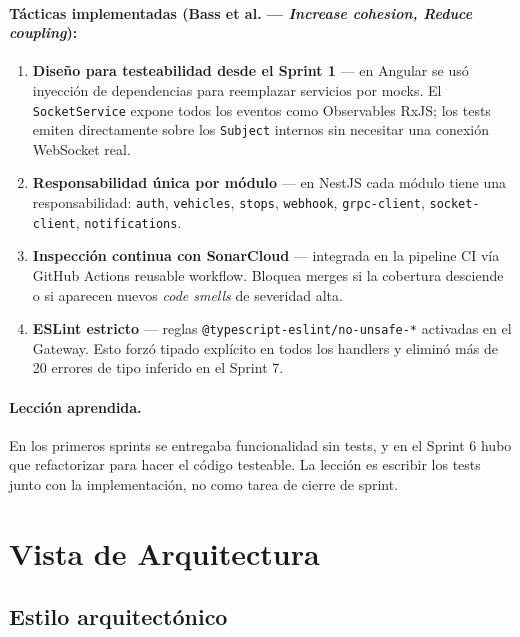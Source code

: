 \documentclass[12pt,a4paper,oneside]{article}
\begin{document}
\paragraph{T\'acticas implementadas (Bass et al. --- \emph{Increase cohesion, Reduce coupling}):}

\begin{enumerate}[leftmargin=*]
  \item \textbf{Dise\~no para testeabilidad desde el Sprint 1} --- en Angular se us\'o inyecci\'on de dependencias para reemplazar servicios por mocks. El \texttt{SocketService} expone todos los eventos como Observables RxJS; los tests emiten directamente sobre los \texttt{Subject} internos sin necesitar una conexi\'on WebSocket real.
  \item \textbf{Responsabilidad \'unica por m\'odulo} --- en NestJS cada m\'odulo tiene una responsabilidad: \texttt{auth}, \texttt{vehicles}, \texttt{stops}, \texttt{webhook}, \texttt{grpc-client}, \texttt{socket-client}, \texttt{notifications}.
  \item \textbf{Inspecci\'on continua con SonarCloud} --- integrada en la pipeline CI v\'ia GitHub Actions reusable workflow. Bloquea merges si la cobertura desciende o si aparecen nuevos \emph{code smells} de severidad alta.
  \item \textbf{ESLint estricto} --- reglas \texttt{@typescript-eslint/no-unsafe-*} activadas en el Gateway. Esto forz\'o tipado expl\'icito en todos los handlers y elimin\'o m\'as de 20 errores de tipo inferido en el Sprint 7.
\end{enumerate}

\paragraph{Lecci\'on aprendida.} En los primeros sprints se entregaba funcionalidad sin tests, y en el Sprint 6 hubo que refactorizar para hacer el c\'odigo testeable. La lecci\'on es escribir los tests junto con la implementaci\'on, no como tarea de cierre de sprint.

\section{Vista de Arquitectura}

\subsection{Estilo arquitect\'onico}
\end{document}
